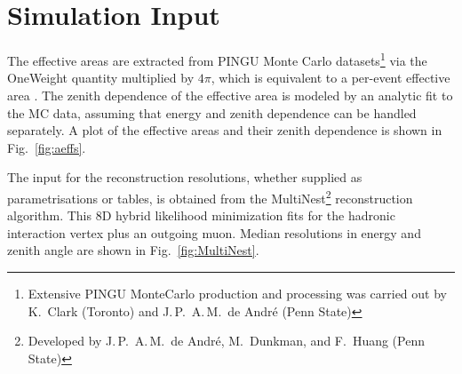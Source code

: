 \section{Simulation Input}
\label{sec:sim_input}


The effective areas are
extracted from PINGU Monte Carlo datasets\footnote{Extensive PINGU MonteCarlo
production and processing was carried out by K.\ Clark (Toronto) and J.\,P.\
A.\,M.\ de Andr\'{e} (Penn State)} via the OneWeight quantity multiplied by
$4\pi$, which is equivalent to a per-event effective area \cite{OneWeight}. The
zenith dependence of the effective area is modeled by an analytic fit to the MC
data, assuming that energy and zenith dependence can be handled separately. A
plot of the effective areas and their zenith dependence is shown in
Fig.~\ref{fig:aeffs}.



The input for the reconstruction resolutions, whether supplied as
parametrisations or tables, is obtained from the
\textsf{MultiNest}\footnote{Developed by J.\,P.\ A.\,M.\ de Andr\'{e},
M.\ Dunkman, and F.\ Huang (Penn State)} reconstruction algorithm. This 8D
hybrid likelihood minimization fits for the hadronic interaction vertex plus an
outgoing muon. Median resolutions in energy and zenith angle are shown in
Fig.~\ref{fig:MultiNest}.


